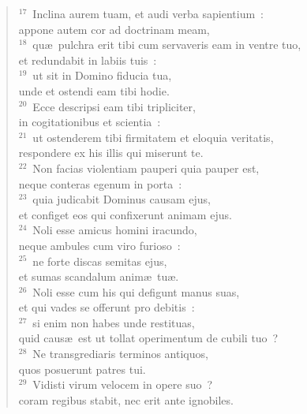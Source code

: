 \begin{flushleft}\begin{verse}${}^{17}$~Inclina aurem tuam, et audi verba sapientium~:\\ appone autem cor ad doctrinam meam,\\
${}^{18}$~qu\ae\ pulchra erit tibi cum servaveris eam in ventre tuo,\\ et redundabit in labiis tuis~:\\
${}^{19}$~ut sit in Domino fiducia tua,\\ unde et ostendi eam tibi hodie.\\
${}^{20}$~Ecce descripsi eam tibi tripliciter,\\ in cogitationibus et scientia~:\\
${}^{21}$~ut ostenderem tibi firmitatem et eloquia veritatis,\\ respondere ex his illis qui miserunt te.\\
${}^{22}$~Non facias violentiam pauperi quia pauper est,\\ neque conteras egenum in porta~:\\
${}^{23}$~quia judicabit Dominus causam ejus,\\ et configet eos qui confixerunt animam ejus.\\
${}^{24}$~Noli esse amicus homini iracundo,\\ neque ambules cum viro furioso~:\\
${}^{25}$~ne forte discas semitas ejus,\\ et sumas scandalum anim\ae\ tu\ae .\\
${}^{26}$~Noli esse cum his qui defigunt manus suas,\\ et qui vades se offerunt pro debitis~:\\
${}^{27}$~si enim non habes unde restituas,\\ quid caus\ae\ est ut tollat operimentum de cubili tuo~?\\
${}^{28}$~Ne transgrediaris terminos antiquos,\\ quos posuerunt patres tui.\\
${}^{29}$~Vidisti virum velocem in opere suo~?\\ coram regibus stabit, nec erit ante ignobiles.\end{verse}\end{flushleft}


